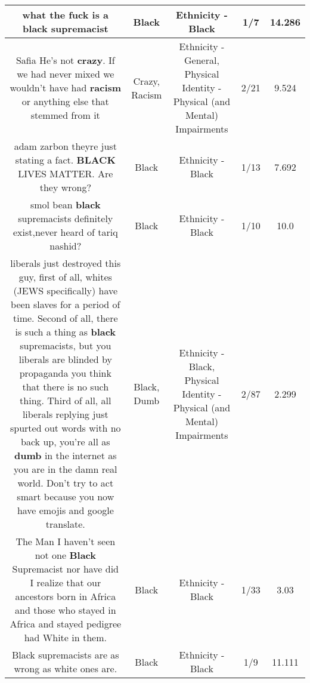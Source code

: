 \documentclass[11pt]{article}
\newlength\mylength
\begin{document}
\begin{center}
\begin{longtable}{|C{.65\mylength}|C{.30\mylength}|C{.12\mylength}|C{.12\mylength}|C{.12\mylength}|}
  \small what the fuck is a \textbf{black} supremacist\normalsize   & Black & Ethnicity - Black & 1/7 & 14.286 \\  \hline
  \small Safia He's not \textbf{crazy}. If we had never mixed we wouldn't have had \textbf{racism} or anything else that stemmed from it\normalsize   & Crazy, Racism & Ethnicity - General, Physical Identity - Physical (and Mental) Impairments & 2/21 & 9.524 \\  \hline
  \small adam zarbon theyre just stating a fact. \textbf{BLACK} LIVES MATTER. Are they wrong?\normalsize   & Black & Ethnicity - Black & 1/13 & 7.692 \\  \hline
  \small smol bean \textbf{black} supremacists definitely exist,never heard of tariq nashid?\normalsize   & Black & Ethnicity - Black & 1/10 & 10.0 \\  \hline
  \small liberals just destroyed this guy, first of all, whites (JEWS specifically) have been slaves for a period of time.  Second of all, there is such a thing as \textbf{black} supremacists, but you liberals are blinded by propaganda you think that there is no such thing.  Third of all, all liberals replying just spurted out words with no back up, you're all as \textbf{dumb} in the internet as you are in the damn real world.  Don't try to act smart because you now have emojis and google translate.\normalsize   & Black, Dumb & Ethnicity - Black, Physical Identity - Physical (and Mental) Impairments & 2/87 & 2.299 \\  \hline
  \small The Man I haven't seen not one \textbf{Black} Supremacist nor have did I realize that our ancestors born in Africa and those who stayed in Africa and stayed pedigree had White in them.\normalsize   & Black & Ethnicity - Black & 1/33 & 3.03 \\  \hline
  \small Black supremacists are as wrong as white ones are.\normalsize   & Black & Ethnicity - Black & 1/9 & 11.111 \\  \hline

\end{longtable}
\end{center}
\end{document}
